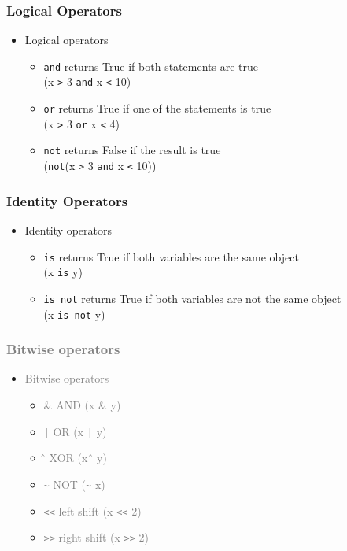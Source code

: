\documentclass{beamer}
\begin{document}
\begin{frame}
  \frametitle{Logical Operators}
  \begin{itemize}
    \item Logical operators
    \begin{itemize}
      \item \texttt{and} returns True if both statements are true \\(x \texttt{>} 3 \texttt{and} x \texttt{<} 10)
      \item \texttt{or} returns True if one of the statements is true \\(x \texttt{>} 3 \texttt{or} x \texttt{<} 4) 
      \item \texttt{not} returns False if the result is true \\(\texttt{not}(x \texttt{>} 3 \texttt{and} x \texttt{<} 10))
    \end{itemize}
  \end{itemize}
\end{frame}

\begin{frame}
  \frametitle{Identity Operators}
  \begin{itemize}
    \item Identity operators
    \begin{itemize}
      \item \texttt{is} returns True if both variables are the same object \\(x \texttt{is} y)
      \item \texttt{is not} returns True if both variables are not the same object \\(x \texttt{is not} y)
    \end{itemize}
  \end{itemize}
\end{frame}
\begin{frame}
  \frametitle{\textcolor{gray}{Bitwise operators}}
  \begin{itemize}
    \item \textcolor{gray}{Bitwise operators}
    \begin{itemize}
      \item \textcolor{gray}{\& AND (x \& y)}
      \item \textcolor{gray}{\texttt{|} OR (x \texttt{|} y)}
      \item \textcolor{gray}{\^ \, XOR (x \^ \, y)}
      \item \textcolor{gray}{\texttt{\~} NOT (\texttt{\~} x)}
      \item \textcolor{gray}{\texttt{<<} left shift (x \texttt{<<} 2)}
      \item \textcolor{gray}{\texttt{>>} right shift (x \texttt{>>} 2)}
    \end{itemize}
  \end{itemize}
\end{frame}
\end{document}
